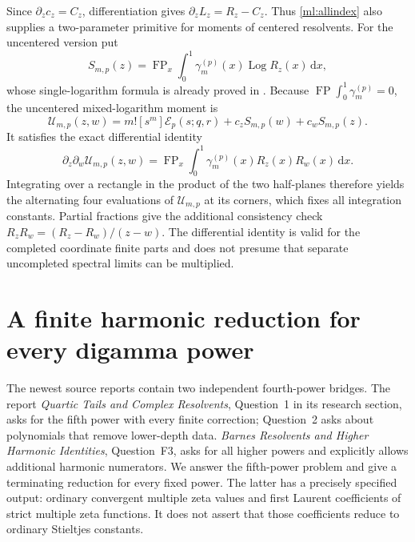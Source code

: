 \documentclass[11pt]{article}
\numberwithin{equation}{section}
\theoremstyle{plain}
\theoremstyle{definition}
\theoremstyle{remark}
\DeclareMathOperator{\Log}{Log}
\DeclareMathOperator{\FP}{FP}
\newcommand{\dd}{\,\mathrm d}
\begin{document}
Since $\partial_zc_z=C_z$, differentiation gives
$\partial_zL_z=R_z-C_z$. Thus \eqref{ml:allindex} also supplies a
two-parameter primitive for moments of centered resolvents. For the
uncentered version put
\[
 S_{m,p}(z)=\FP_x\int_0^1\gamma_m^{(p)}(x)\Log R_z(x)\dd x,
\]
whose single-logarithm formula is already proved in
\cite[complex-power section]{repo:quartic}. Because
$\FP\int_0^1\gamma_m^{(p)}=0$, the uncentered mixed-logarithm moment is
\begin{equation}\label{ml:uncentered}
 \mathcal U_{m,p}(z,w)=m![s^m]\mathcal E_p(s;q,r)
                                      +c_zS_{m,p}(w)+c_wS_{m,p}(z).
\end{equation}
It satisfies the exact differential identity
\begin{equation}\label{ml:doubleprimitive}
 \partial_z\partial_w\mathcal U_{m,p}(z,w)
       =\FP_x\int_0^1\gamma_m^{(p)}(x)R_z(x)R_w(x)\dd x.
\end{equation}
Integrating over a rectangle in the product of the two half-planes
therefore yields the alternating four evaluations of
$\mathcal U_{m,p}$ at its corners, which fixes all integration constants.
Partial fractions give the additional consistency check
$R_zR_w=(R_z-R_w)/(z-w)$. The differential identity is valid for
the completed coordinate finite parts and does not presume that separate
uncompleted spectral limits can be multiplied.



\section{A finite harmonic reduction for every digamma power}
\label{hp:sec:all}

The newest source reports contain two independent fourth-power bridges.
The report \emph{Quartic Tails and Complex Resolvents}, Question~1 in its
research section, asks for the fifth power with every finite correction\cite{repo:quartic};
Question~2 asks about polynomials that remove lower-depth data.
\emph{Barnes Resolvents and Higher Harmonic Identities}, Question~F3, asks for
all higher powers and explicitly allows additional harmonic numerators\cite{repo:barnes}.
We answer the fifth-power problem and give a terminating reduction for
every fixed power. The latter has a precisely specified output: ordinary
convergent multiple zeta values and first Laurent coefficients of strict
multiple zeta functions. It does not assert that those coefficients
reduce to ordinary Stieltjes constants.
\end{document}
